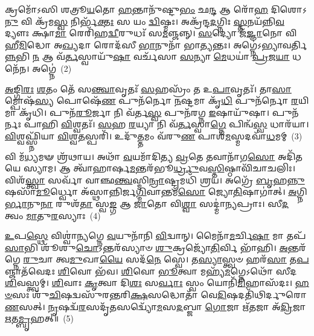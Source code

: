 𑌕𑍍𑌰𑌮𑍋᳴\-𑌽𑌸𑌿 𑌶𑌤𑍍𑌰𑍂\-\ul{𑌯}\-𑌤𑍋 \ul{𑌹}\-𑌨𑍍𑌤𑌾𑌨𑍁᳴𑌷𑍍𑌟𑍁\-\ul{𑌭𑌂} 𑌛\-\ul{𑌨𑍍𑌦} 𑌆 𑌰𑍋᳴\-\ul{𑌹} 𑌦𑌿𑌶𑍋\-𑌽\-\ul{𑌨𑍁} 𑌵𑌿 𑌕𑍍𑌰᳴𑌮\-\ul{𑌸𑍍𑌵} 𑌨𑌿𑌰𑍍𑌭᳴\-\ul{𑌕𑍍𑌤𑌃} 𑌸 𑌯𑌂 \ul{𑌦𑍍𑌵𑌿}\-𑌷𑍍𑌮𑌃। 𑌅𑌕𑍍𑌰᳴𑌨𑍍𑌦\-\ul{𑌦}\-𑌗𑍍𑌨𑌿𑌃 \ul{𑌸𑍍𑌤}\-𑌨𑌯᳴𑌨𑍍𑌨𑌿\-\ul{𑌵} 𑌦𑍍𑌯𑍗𑌃 𑌕𑍍𑌷𑌾\-\ul{𑌮𑌾} 𑌰𑍇𑌰𑌿᳴𑌹\-\ul{𑌦𑍍𑌵𑍀}\-𑌰𑍁𑌧𑌃᳴ 𑌸\-\ul{𑌮}\-𑌞𑍍𑌜𑌨𑍍𑌨𑍍। \ul{𑌸}\-𑌦𑍍𑌯𑍋 𑌜᳴\-\ul{𑌜𑍍𑌞𑌾}\-𑌨𑍋 𑌵𑌿 𑌹𑍀\-\ul{𑌮𑌿}\-𑌦𑍍𑌧𑍋 𑌅\-\ul{𑌖𑍍𑌯}\-𑌦𑌾 𑌰𑍋𑌦᳴𑌸𑍀 \ul{𑌭𑌾}\-𑌨𑍁𑌨𑌾᳴ 𑌭𑌾\-\ul{𑌤𑍍𑌯}\-𑌨𑍍𑌤𑌃। 𑌅𑌗𑍍𑌨𑍇॑\-𑌽𑌭𑍍𑌯𑌾𑌵𑌰𑍍𑌤𑌿\-\ul{𑌨𑍍𑌨}\-𑌭𑌿 \ul{𑌨} 𑌆 𑌵᳴\-\ul{𑌰𑍍𑌤}\-𑌸𑍍𑌵𑌾𑌯𑍁᳴\-\ul{𑌷𑌾} 𑌵𑌰𑍍𑌚᳴𑌸𑌾 \ul{𑌸}\-𑌨𑍍𑌯𑌾 \ul{𑌮𑍇}\-𑌧𑌯𑌾॑ \ul{𑌪𑍍𑌰}\-𑌜\-\ul{𑌯𑌾} 𑌧𑌨𑍇᳴𑌨। 𑌅𑌗𑍍𑌨𑍇॑~(2)

\-\ul{𑌅}\-\-\ul{𑌙𑍍𑌗𑌿}\-\-\ul{𑌰𑌃} \ul{𑌶}\-𑌤𑌂 𑌤𑍇᳴ 𑌸\-\ul{𑌨𑍍𑌤𑍍𑌵𑌾}\-𑌵𑍃𑌤𑌃᳴ \ul{𑌸}\-𑌹𑌸𑍍𑌰𑌂᳴ 𑌤 𑌉\-\ul{𑌪𑌾}\-𑌵𑍃𑌤𑌃᳴। 𑌤𑌾\-\ul{𑌸𑌾}\-𑌮𑍍𑌪𑍋𑌷᳴\-\ul{𑌸𑍍𑌯} 𑌪𑍋𑌷𑍇᳴\-\ul{𑌣} 𑌪𑍁𑌨᳴𑌰𑍍𑌨𑍋 \ul{𑌨}\-𑌷𑍍𑌟𑌮𑌾 𑌕𑍃᳴\-\ul{𑌧𑌿} 𑌪𑍁𑌨᳴𑌰𑍍𑌨𑍋 \ul{𑌰}\-𑌯𑌿𑌮𑌾 𑌕𑍃᳴𑌧𑌿। 𑌪𑍁𑌨᳴\-\ul{𑌰𑍂}\-𑌰𑍍𑌜𑌾 𑌨𑌿 𑌵᳴𑌰𑍍𑌤\-\ul{𑌸𑍍𑌵} 𑌪𑍁𑌨᳴𑌰𑌗𑍍𑌨 \ul{𑌇}\-𑌷𑌾𑌯𑍁᳴𑌷𑌾। 𑌪𑍁𑌨᳴𑌰𑍍𑌨𑌃 𑌪𑌾𑌹𑌿 \ul{𑌵𑌿}\-𑌶𑍍𑌵𑌤𑌃᳴। \ul{𑌸}\-𑌹 \ul{𑌰}\-𑌯𑍍𑌯𑌾 𑌨𑌿 𑌵᳴\-\ul{𑌰𑍍𑌤}\-𑌸𑍍𑌵𑌾\-\ul{𑌗𑍍𑌨𑍇} 𑌪𑌿𑌨𑍍𑌵᳴\-\ul{𑌸𑍍𑌵} 𑌧𑌾𑌰᳴𑌯𑌾। \ul{𑌵𑌿}\-𑌶𑍍𑌵𑌫𑍍𑌸𑍍𑌨𑌿᳴𑌯𑌾 \ul{𑌵𑌿}\-𑌶𑍍𑌵\-\ul{𑌤}\-𑌸𑍍𑌪𑌰𑌿᳴। 𑌉𑌦𑍁᳴\-\ul{𑌤𑍍𑌤}\-𑌮𑌂 𑌵᳴𑌰𑍁\-\ul{𑌣} 𑌪𑌾𑌶᳴\-\ul{𑌮}\-𑌸𑍍𑌮𑌦𑌵𑌾᳴\-\ul{𑌧}\-𑌮𑌮𑍍~(3)

𑌵𑌿 𑌮᳴\-\ul{𑌧𑍍𑌯}\-𑌮𑍟 𑌶𑍍𑌰᳴𑌥𑌾𑌯। 𑌅𑌥𑌾᳴ \ul{𑌵}\-𑌯𑌮𑌾᳴𑌦𑌿𑌤𑍍𑌯 \ul{𑌵𑍍𑌰}\-𑌤𑍇 𑌤𑌵𑌾𑌨𑌾᳴𑌗\-\ul{𑌸𑍋} 𑌅𑌦𑌿᳴𑌤𑌯𑍇 𑌸𑍍𑌯𑌾𑌮। 𑌆 𑌤𑍍𑌵𑌾᳴𑌹𑌾𑌰𑍍\mbox{}𑌷\-\ul{𑌮}\-𑌨𑍍𑌤𑌰᳴𑌭𑍂\-\ul{𑌰𑍍𑌧𑍍𑌰𑍁}\-𑌵\-\ul{𑌸𑍍𑌤𑌿}\-𑌷𑍍𑌠𑌾\-𑌵𑌿᳴𑌚𑌾𑌚𑌲𑌿𑌃। 𑌵𑌿𑌶᳴\-\ul{𑌸𑍍𑌤𑍍𑌵𑌾} 𑌸𑌰𑍍𑌵𑌾᳴ 𑌵𑌾𑌞𑍍𑌛\-\ul{𑌨𑍍𑌤𑍍𑌵}\-𑌸𑍍𑌮𑌿\-\ul{𑌨𑍍𑌰𑌾}\-𑌷𑍍𑌟𑍍𑌰𑌮𑌧𑌿᳴ 𑌶𑍍𑌰𑌯। 𑌅𑌗𑍍𑌰𑍇᳴ \ul{𑌬𑍃}\-𑌹\-\ul{𑌨𑍍𑌨𑍁}\-𑌷𑌸𑌾᳴\-\ul{𑌮𑍂}\-𑌰𑍍𑌧𑍍𑌵𑍋 𑌅᳴𑌸𑍍𑌥𑌾𑌨𑍍𑌨𑌿𑌰𑍍𑌜\-\ul{𑌗𑍍𑌮𑌿}\-𑌵𑌾𑌨𑍍𑌤𑌮᳴\-\ul{𑌸𑍋} 𑌜𑍍𑌯𑍋\-\ul{𑌤𑌿}\-𑌷𑌾𑌗𑌾॑𑌤𑍍। \ul{𑌅}\-𑌗𑍍𑌨𑌿\-\ul{𑌰𑍍𑌭𑌾}\-𑌨𑍁\-\ul{𑌨𑌾} 𑌰𑍁𑌶᳴\-\ul{𑌤𑌾} 𑌸𑍍𑌵\-\ul{𑌙𑍍𑌗} 𑌆 \ul{𑌜𑌾}\-𑌤𑍋 𑌵𑌿\-\ul{𑌶𑍍𑌵𑌾} 𑌸𑌦𑍍𑌮𑌾॑𑌨𑍍𑌯𑌪𑍍𑌰𑌾𑌃। 𑌸𑍀\-\ul{𑌦} 𑌤𑍍𑌵𑌂 \ul{𑌮𑌾}\-𑌤𑍁\-\ul{𑌰}\-𑌸𑍍𑌯𑌾𑌃~(4)

\-\ul{𑌉}\-𑌪\-\ul{𑌸𑍍𑌥𑍇} 𑌵𑌿𑌶𑍍𑌵𑌾॑𑌨𑍍𑌯𑌗𑍍𑌨𑍇 \ul{𑌵}\-𑌯𑍁𑌨𑌾᳴𑌨𑌿 \ul{𑌵𑌿}\-𑌦𑍍𑌵𑌾𑌨𑍍। 𑌮𑍈𑌨𑌾᳴\-\ul{𑌮}\-𑌰𑍍𑌚𑌿\-\ul{𑌷𑌾} 𑌮𑌾 𑌤𑌪᳴\-\ul{𑌸𑌾}\-𑌭𑌿 𑌶𑍂᳴𑌶𑍁\-\ul{𑌚𑍋}\-\-𑌽𑌨𑍍𑌤𑌰᳴𑌸𑍍𑌯𑌾𑍞 \ul{𑌶𑍁}\-𑌕𑍍𑌰𑌜𑍍𑌯𑍋᳴\-\ul{𑌤𑌿}\-𑌰𑍍𑌵𑌿 𑌭𑌾᳴𑌹𑌿। \ul{𑌅}\-𑌨𑍍𑌤𑌰᳴𑌗𑍍𑌨𑍇 \ul{𑌰𑍁}\-𑌚𑌾 𑌤𑍍𑌵\-\ul{𑌮𑍁}\-𑌖𑌾\-\ul{𑌯𑍈} 𑌸𑌦᳴\-\ul{𑌨𑍇} 𑌸𑍍𑌵𑍇। 𑌤\-\ul{𑌸𑍍𑌯𑌾}\-𑌸𑍍𑌤𑍍𑌵𑍞 𑌹𑌰᳴\-\ul{𑌸𑌾} 𑌤\-\ul{𑌪}\-𑌞𑍍𑌜𑌾𑌤᳴𑌵𑍇𑌦𑌃 \ul{𑌶𑌿}\-𑌵𑍋 𑌭᳴𑌵। \ul{𑌶𑌿}\-𑌵𑍋 \ul{𑌭𑍂}\-𑌤𑍍𑌵𑌾 𑌮𑌹𑍍𑌯᳴\-\ul{𑌮}\-𑌗𑍍𑌨𑍇\-𑌽𑌥𑍋᳴ 𑌸𑍀𑌦 \ul{𑌶𑌿}\-𑌵𑌸𑍍𑌤𑍍𑌵𑌮𑍍। \ul{𑌶𑌿}\-𑌵𑌾𑌃 \ul{𑌕𑍃}\-𑌤𑍍𑌵𑌾 𑌦𑌿\-\ul{𑌶𑌃} 𑌸\-\ul{𑌰𑍍𑌵𑌾𑌃} 𑌸𑍍𑌵𑌂 𑌯𑍋𑌨𑌿᳴\-\ul{𑌮𑌿}\-𑌹𑌾𑌸᳴𑌦𑌃। \ul{𑌹}\-\-\ul{𑍞}\-𑌸𑌃 𑌶𑍁᳴\-\ul{𑌚𑌿}\-𑌷𑌦𑍍𑌵𑌸𑍁᳴𑌰𑌨𑍍𑌤𑌰𑌿\-\ul{𑌕𑍍𑌷}\-𑌸𑌦𑍍𑌧𑍋𑌤𑌾᳴ 𑌵𑍇\-\ul{𑌦𑌿}\-𑌷𑌦𑌤𑌿᳴𑌥𑌿𑌰𑍍𑌦𑍁𑌰𑍋\-\ul{𑌣}\-𑌸𑌤𑍍। \ul{𑌨𑍃}\-𑌷𑌦𑍍𑌵᳴\-\ul{𑌰}\-𑌸𑌦𑍃᳴\-\ul{𑌤}\-𑌸𑌦𑍍𑌵𑍍𑌯𑍋᳴\-\ul{𑌮}\-𑌸\-\ul{𑌦}\-𑌬𑍍𑌜𑌾 \ul{𑌗𑍋}\-𑌜𑌾 𑌋᳴\-\ul{𑌤}\-𑌜𑌾 𑌅᳴\-\ul{𑌦𑍍𑌰𑌿}\-𑌜𑌾 \ul{𑌋}\-𑌤\-\ul{𑌮𑍍𑌬𑍃}\-𑌹𑌤𑍍॥~(5)

{\anuvakamend[{𑌦𑌿\-\ul{𑌵}\-𑌮\-\ul{𑌨𑍁} 𑌵𑌿 𑌕𑍍𑌰᳴𑌮\-\ul{𑌸𑍍𑌵} 𑌨𑌿𑌰𑍍𑌭᳴\-\ul{𑌕𑍍𑌤𑌃} 𑌸 𑌯𑌂 \ul{𑌦𑍍𑌵𑌿}\-𑌷𑍍𑌮𑍋 𑌵𑌿\-\ul{𑌷𑍍𑌣𑍋}\-𑌰𑍍𑌧\-\ul{𑌨𑍇}\-𑌨𑌾𑌗𑍍𑌨𑍇᳴\-𑌽\-\ul{𑌧}\-𑌮\-\ul{𑌮}\-𑌸𑍍𑌯𑌾𑌃 𑌶𑍁᳴\-\ul{𑌚𑌿}\-𑌷𑌥𑍍𑌷𑍋𑌡᳴𑌶 𑌚}]}%

